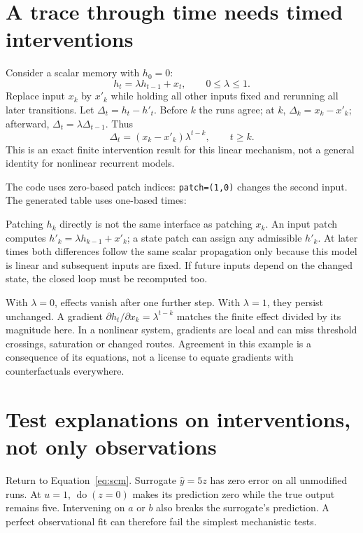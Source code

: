 \section{A trace through time needs timed interventions}
Consider a scalar memory with $h_0=0$:
\begin{equation}
 h_t=\lambda h_{t-1}+x_t,\qquad 0\leq\lambda\leq1.
\end{equation}
Replace input $x_k$ by $x'_k$ while holding all other inputs fixed and
rerunning all later transitions. Let $\Delta_t=h_t-h'_t$. Before $k$ the
runs agree; at $k$, $\Delta_k=x_k-x'_k$; afterward,
$\Delta_t=\lambda\Delta_{t-1}$. Thus
\begin{equation}
 \Delta_t=(x_k-x'_k)\lambda^{t-k},\qquad t\geq k.
 \label{eq:decay}
\end{equation}
This is an exact finite intervention result for this linear mechanism, not
a general identity for nonlinear recurrent models.


The code uses zero-based patch indices: \texttt{patch=(1,0)} changes the
second input. The generated table uses one-based times:
\begin{center}\end{center}
Patching $h_k$ directly is not the same interface as patching $x_k$.
An input patch computes $h'_k=\lambda h_{k-1}+x'_k$; a state patch can
assign any admissible $h'_k$. At later times both differences follow the
same scalar propagation only because this model is linear and subsequent
inputs are fixed. If future inputs depend on the changed state, the closed
loop must be recomputed too.

With $\lambda=0$, effects vanish after one further step. With $\lambda=1$,
they persist unchanged. A gradient $\partial h_t/\partial x_k=\lambda^{t-k}$
matches the finite effect divided by its magnitude here. In a nonlinear
system, gradients are local and can miss threshold crossings, saturation
or changed routes. Agreement in this example is a consequence of its
equations, not a license to equate gradients with counterfactuals everywhere.

\section{Test explanations on interventions, not only observations}
Return to Equation~\ref{eq:scm}. Surrogate $\hat y=5z$ has zero error on
all unmodified runs. At $u=1$, $\operatorname{do}(z=0)$ makes its prediction
zero while the true output remains five. Intervening on $a$ or $b$ also
breaks the surrogate's prediction. A perfect observational fit can therefore
fail the simplest mechanistic tests.

